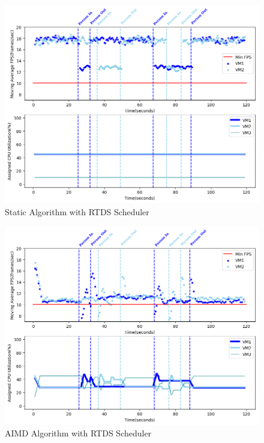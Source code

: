 \begin{itemize}
\begin{figure}[h!]
\centering
\includegraphics[width=1\linewidth]{images/3vm_static}
\caption{Static Algorithm with RTDS Scheduler}
\label{3vm_static}
\end{figure}

\begin{figure}[h!]
\centering
\includegraphics[width=1\linewidth]{images/3vm_aimd}
\caption{AIMD Algorithm with RTDS Scheduler}
\label{3vm_aimd}
\end{figure}


\end{itemize}

